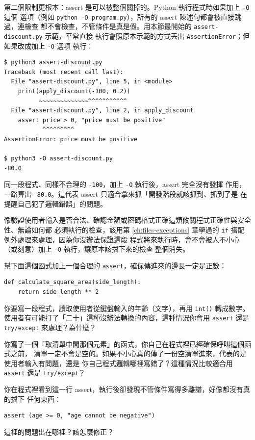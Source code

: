 第二個限制更根本：assert 是可以被整個關掉的。Python 執行程式時如果加上 \texttt{-O} 這個
選項（例如 \texttt{python -O program.py}），所有的 assert 陳述句都會被直接跳過，連檢查
都不會檢查，不管條件是真是假。用本節最開始的 \texttt{assert-discount.py} 示範，平常直接
執行會照原本示範的方式丟出 \texttt{AssertionError}；但如果改成加上 \texttt{-O} 選項
執行：

\begin{verbatim}
$ python3 assert-discount.py
Traceback (most recent call last):
  File "assert-discount.py", line 5, in <module>
    print(apply_discount(-100, 0.2))
          ~~~~~~~~~~~~~~^^^^^^^^^^^
  File "assert-discount.py", line 2, in apply_discount
    assert price > 0, "price must be positive"
           ^^^^^^^^^
AssertionError: price must be positive

$ python3 -O assert-discount.py
-80.0
\end{verbatim}

同一段程式、同樣不合理的 \texttt{-100}，加上 \texttt{-O} 執行後，assert 完全沒有發揮
作用，一路算出 \texttt{-80.0}。這代表 assert 只適合拿來抓「開發階段就該抓到、抓到了是
在提醒自己犯了邏輯錯誤」的問題。

像驗證使用者輸入是否合法、確認金額或密碼格式正確這類攸關程式正確性與安全性、無論如何都
必須執行的檢查，該用第 \ref{ch:files-exceptions} 章學過的 \texttt{if} 搭配例外處理來處理，因為你沒辦法保證這段
程式將來執行時，會不會被人不小心（或刻意）加上 \texttt{-O} 執行，讓原本該擋下來的檢查
整個消失。


\begin{drills}[label=drills:assert]
\item 幫下面這個函式加上一個合理的 \texttt{assert}，確保傳進來的邊長一定是正數：
\begin{verbatim}
def calculate_square_area(side_length):
    return side_length ** 2
\end{verbatim}
\item 你要寫一段程式，讀取使用者從鍵盤輸入的年齡（文字），再用 \texttt{int()} 轉成數字。
使用者有可能打了「二十」這種沒辦法轉換的內容，這種情況你會用 \texttt{assert} 還是
\texttt{try/except} 來處理？為什麼？
\item 你寫了一個「取清單中間那個元素」的函式，你自己在程式裡已經確保呼叫這個函式之前，
清單一定不會是空的。如果不小心真的傳了一份空清單進來，代表的是使用者輸入有問題，還是
你自己程式邏輯哪裡寫錯了？這種情況比較適合用 \texttt{assert} 還是 \texttt{try/except}？
\item 你在程式裡看到這一行 assert，執行後卻發現不管條件寫得多離譜，好像都沒有真的擋下
任何東西：
\begin{verbatim}
assert (age >= 0, "age cannot be negative")
\end{verbatim}
這裡的問題出在哪裡？該怎麼修正？
\end{drills}

